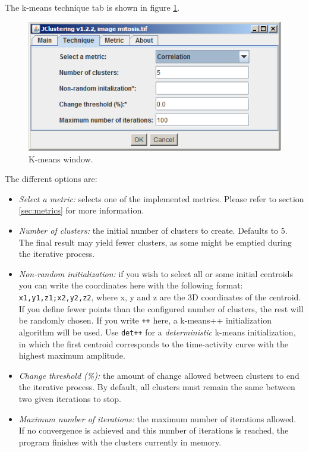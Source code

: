 \documentclass[11pt]{article} %
\begin{document}
The k-means technique tab is shown in figure \ref{fig:k-means_window}.

\begin{figure}[h!]
  \centering
    \includegraphics[width=\textwidth]{figures/k-means_window}
  \caption{K-means window.}
  \label{fig:k-means_window}
\end{figure}

The different options are:
\begin{itemize}
\item {\em Select a metric:} selects one of the implemented metrics. Please refer to section \ref{sec:metrics} for more
information.
\item {\em Number of clusters:} the initial number of clusters to create. Defaults to 5. The final result may yield fewer clusters, as
some might be emptied during the iterative process.
\item {\em Non-random initialization:} if you wish to select all or some initial centroids you can write the coordinates here
with the following format: \texttt{x1,y1,z1;x2,y2,z2}, where x, y and z are the 3D coordinates of the centroid. If you define
fewer points than the configured number of clusters, the rest will be randomly chosen. If you write \texttt{++} here, a 
k-means++ initialization algorithm will be used. Use \texttt{det++} for a \emph{deterministic} k-means initialization, in which 
the first centroid corresponds to the time-activity curve with the highest maximum amplitude.
\item {\em Change threshold (\%):} the amount of change allowed between clusters to end the iterative process. By default,
all clusters must remain the same between two given iterations to stop.
\item {\em Maximum number of iterations:} the maximum number of iterations allowed. If no convergence is achieved and this
number of iterations is reached, the program finishes with the clusters currently in memory.

\end{itemize}
\end{document}
